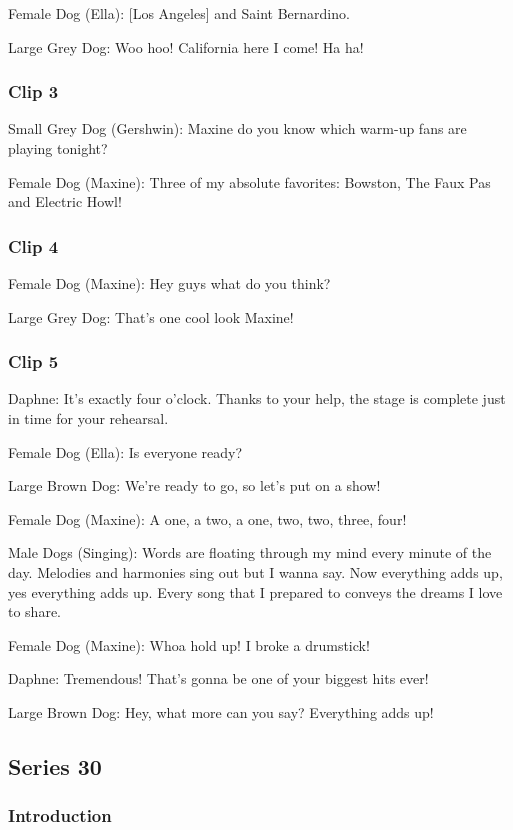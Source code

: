 Female Dog (Ella): [Los Angeles] and Saint Bernardino.

Large Grey Dog: Woo hoo! California here I come! Ha ha!

\subsubsection{Clip 3}

Small Grey Dog (Gershwin): Maxine do you know which warm-up fans are playing tonight?

Female Dog (Maxine): Three of my absolute favorites: Bowston, The Faux Pas and Electric Howl!

\subsubsection{Clip 4}

Female Dog (Maxine): Hey guys what do you think?

Large Grey Dog: That's one cool look Maxine!

\subsubsection{Clip 5}

Daphne: It's exactly four o'clock. Thanks to your help, the stage is complete just in time for your rehearsal.

Female Dog (Ella): Is everyone ready?

Large Brown Dog: We're ready to go, so let's put on a show!

Female Dog (Maxine): A one, a two, a one, two, two, three, four!

Male Dogs (Singing): Words are floating through my mind every minute of the day. Melodies and harmonies sing out but I wanna say. Now everything adds up, yes everything adds up. Every song that I prepared to conveys the dreams I love to share.

Female Dog (Maxine): Whoa hold up! I broke a drumstick!

Daphne: Tremendous! That's gonna be one of your biggest hits ever!

Large Brown Dog: Hey, what more can you say? Everything adds up!

\subsection{Series 30}

\subsubsection{Introduction}

